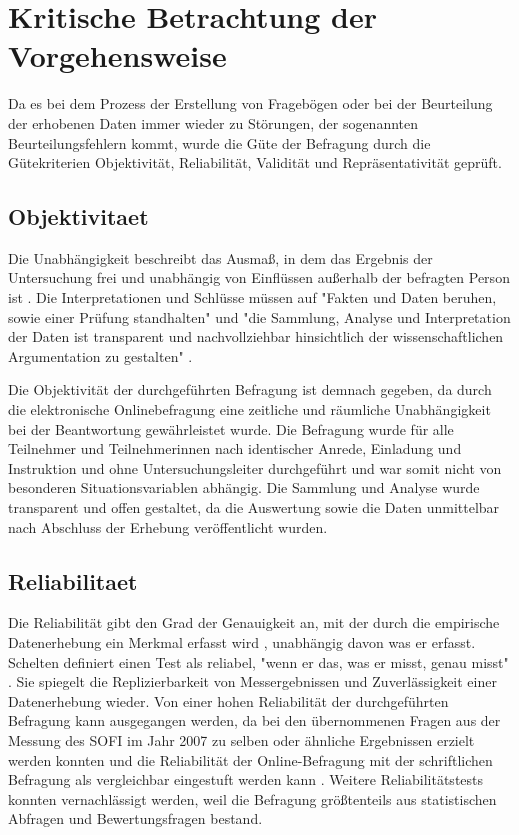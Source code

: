 \section{Kritische Betrachtung der Vorgehensweise}

Da es bei dem Prozess der Erstellung von Fragebögen oder bei der Beurteilung der erhobenen Daten immer wieder zu Störungen, der sogenannten Beurteilungsfehlern kommt, wurde die Güte der Befragung durch die Gütekriterien Objektivität, Reliabilität, Validität und Repräsentativität geprüft.

\subsection{Objektivitaet}

Die Unabhängigkeit beschreibt das Ausmaß, in dem das Ergebnis der Untersuchung frei und unabhängig von Einflüssen außerhalb der befragten Person ist \cite{rost_2004_lehrbuch}. Die Interpretationen und Schlüsse müssen auf "Fakten und Daten beruhen, sowie einer Prüfung standhalten" und "die Sammlung, Analyse und Interpretation der Daten ist transparent und nachvollziehbar hinsichtlich der wissenschaftlichen Argumentation zu gestalten" \cite{Bargheer_2015}.

Die Objektivität der durchgeführten Befragung ist demnach gegeben, da durch die elektronische Onlinebefragung eine zeitliche und räumliche Unabhängigkeit bei der Beantwortung gewährleistet wurde. Die Befragung wurde für alle Teilnehmer und Teilnehmerinnen nach identischer Anrede, Einladung und Instruktion und ohne Untersuchungsleiter durchgeführt und war somit nicht von besonderen Situationsvariablen abhängig. Die Sammlung und Analyse wurde transparent und offen gestaltet, da die Auswertung sowie die Daten unmittelbar nach Abschluss der Erhebung veröffentlicht wurden.

\subsection{Reliabilitaet}

Die Reliabilität gibt den Grad der Genauigkeit an, mit der durch die empirische Datenerhebung ein Merkmal erfasst wird \cite{rost_2004_lehrbuch}, unabhängig davon was er erfasst. Schelten definiert einen Test als reliabel, "wenn er das, was er misst, genau misst" \cite{schelten_1997_testbeurteilung}.  Sie spiegelt die Replizierbarkeit von Messergebnissen und Zuverlässigkeit einer Datenerhebung wieder. Von einer hohen Reliabilität der durchgeführten Befragung kann ausgegangen werden, da bei den übernommenen Fragen aus der Messung des SOFI im Jahr 2007 zu selben oder ähnliche Ergebnissen erzielt werden konnten und die Reliabilität der Online-Befragung mit der schriftlichen Befragung als vergleichbar eingestuft werden kann \cite{suchen_DOI_10.1007/978-3-663-10948-8_10}. Weitere Reliabilitätstests konnten vernachlässigt werden, weil die Befragung größtenteils aus statistischen Abfragen und Bewertungsfragen bestand.

